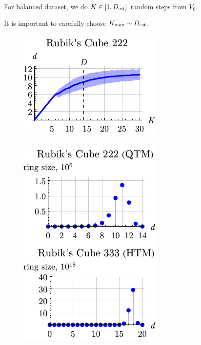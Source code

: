 


For balanced dataset, we do $K \in [1, D_{\textnormal{est}}]$ random steps from $V_0$.
\vfill

\begin{minipage}{0.55\textwidth}
It is important to carefully choose $K_{\textnormal{max}} \sim D_{\textnormal{est}}$.
    \begin{figure}[h]
        \centering
        \includegraphics{imgs/dK_dist.pdf}
    \end{figure}
    
\end{minipage}
\hfill
\begin{minipage}{0.4\textwidth}
	\begin{figure}[h]
	    \centering
	    \includegraphics{imgs/d_dist.pdf}
	\end{figure}
\end{minipage}


